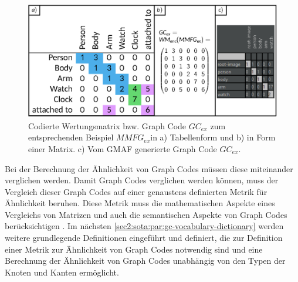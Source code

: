 \begin{figure}[htb]
    \centering
    \includegraphics[width=\textwidth, keepaspectratio]{chapter/chapter_2/valuation-matrix-enc.eps}
    \caption{Codierte Wertungsmatrix bzw. Graph Code $GC_{ex}$ zum entsprechenden Beispiel $MMFG_{ex}$in a) Tabellenform und b) in Form einer Matrix. c) Vom GMAF generierte Graph Code $GC_{ex}$.}
    \label{sec2:sota:subsec:fz-explainablity:fig:mmfg-valuation-matrix-enc}
\end{figure}

%


Bei der Berechnung der Ähnlichkeit von Graph Codes müssen diese miteinander verglichen werden.
Damit Graph Codes verglichen werden können, muss der Vergleich dieser Graph Codes auf einer genaustens definierten Metrik für Ähnlichkeit beruhen.
Diese Metrik muss die mathematischen Aspekte eines Vergleichs von Matrizen und auch die semantischen Aspekte von Graph Codes berücksichtigen \cite{gc-2d-proj-mmfg}.
Im nächsten \cref{sec2:sota:par:gc-vocabulary-dictionary} werden weitere grundlegende Definitionen eingeführt und definiert, die zur Definition einer Metrik zur Ähnlichkeit von Graph Codes notwendig sind und eine Berechnung der Ähnlichkeit von Graph Codes unabhängig von den Typen der Knoten und Kanten ermöglicht.

